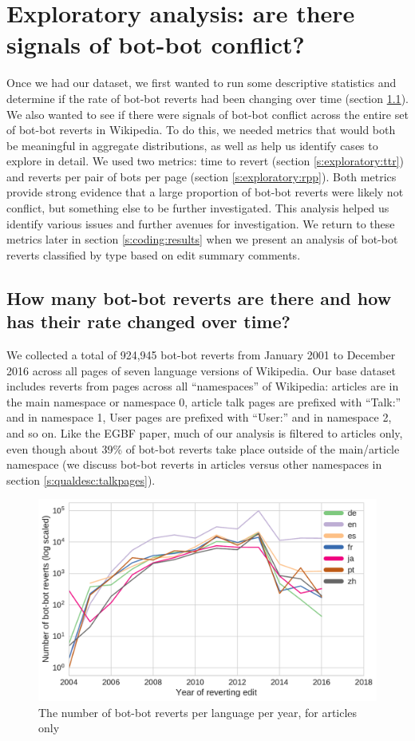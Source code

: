 \documentclass[format=acmsmall, review=false, screen=true]{acmart}%
\begin{document}
\section{Exploratory analysis: are there signals of bot-bot conflict?}  
\label{s:exploratory}
Once we had our dataset, we first wanted to run some descriptive statistics and determine if the rate of bot-bot reverts had been changing over time (section \ref{s:exploratory:counts}). We also wanted to see if there were signals of bot-bot conflict across the entire set of bot-bot reverts in Wikipedia. To do this, we needed metrics that would both be meaningful in aggregate distributions, as well as help us identify cases to explore in detail. We used two metrics: time to revert (section \ref{s:exploratory:ttr}) and reverts per pair of bots per page (section \ref{s:exploratory:rpp}). Both metrics provide strong evidence that a large proportion of bot-bot reverts were likely not conflict, but something else to be further investigated. This analysis helped us identify various issues and further avenues for investigation. We return to these metrics later in section \ref{s:coding:results} when we present an analysis of bot-bot reverts classified by type based on edit summary comments.



\subsection{How many bot-bot reverts are there and how has their rate changed over time?}  \label{s:exploratory:counts}
We collected a total of 924,945 bot-bot reverts from January 2001 to December 2016 across all pages of seven language versions of Wikipedia. Our base dataset includes reverts from pages across all ``namespaces'' of Wikipedia: articles are in the main namespace or namespace 0, article talk pages are prefixed with ``Talk:'' and in namespace 1, User pages are prefixed with ``User:'' and in namespace 2, and so on. Like the EGBF paper, much of our analysis is filtered to articles only, even though about 39\% of bot-bot reverts take place outside of the main/article namespace (we discuss bot-bot reverts in articles versus other namespaces in section \ref{s:qualdesc:talkpages}).  

\begin{figure}[h]
\includegraphics[width=.8\textwidth]{figures/reverts-yearly-counts.pdf}
\caption{The number of bot-bot reverts per language per year, for articles only}
\label{fig:reverts-yearly-counts}
\end{figure}
\end{document}
